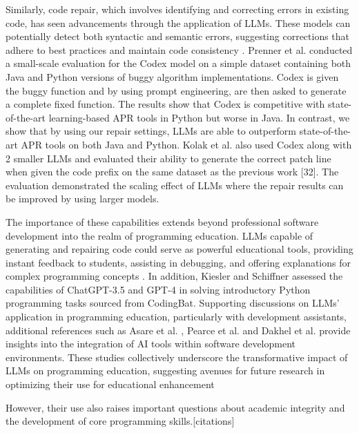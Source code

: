 Similarly, code repair, which involves identifying and correcting errors in existing code, has seen advancements through the application of LLMs. These models can potentially detect both syntactic and semantic errors, suggesting corrections that adhere to best practices and maintain code consistency \cite{DBLP:conf/icse/JiangL021, parasaram2024factselectionproblemllmbased, olausson2024selfrepairsilverbulletcode}. Prenner et al. \cite{10.1145/3524459.3527351} conducted a small-scale evaluation for the Codex model on a simple dataset containing both Java and Python versions of buggy algorithm implementations. Codex is given the buggy function and by using prompt engineering, are then asked to generate a complete fixed function. The results show that Codex is competitive with state-of-the-art learning-based APR tools in Python but worse in Java. In contrast, we show that by using our repair settings, LLMs are able to outperform state-of-the-art APR tools on both Java and Python. Kolak et al. \cite{osti_10340618} also used Codex along with 2 smaller LLMs and evaluated their ability to generate the correct patch line when given the code prefix on the same dataset as the previous work [32]. The evaluation demonstrated the scaling effect of LLMs where the repair results can be improved by using larger models.

The importance of these capabilities extends beyond professional software development into the realm of programming education. LLMs capable of generating and repairing code could serve as powerful educational tools, providing instant feedback to students, assisting in debugging, and offering explanations for complex programming concepts \cite{10.1145/3597503.3639219, 10.1145/3544548.3580919, 10.1145/3631802.3631806, 10.1145/3613904.3642706, jury2024evaluating}. In addition, Kiesler and Schiffner \cite{kiesler2023largelanguagemodelsintroductory} assessed the capabilities of ChatGPT-3.5 and GPT-4 in solving introductory Python programming tasks sourced from CodingBat. Supporting discussions on LLMs’ application in programming education, particularly with development assistants, additional references such as Asare et al. \cite{10.1007/s10664-023-10380-1}, Pearce et al. \cite{DBLP:conf/sp/PearceA0DK22} and Dakhel et al. \cite{DBLP:journals/jss/DakhelMNKDJ23} provide insights into the integration of AI tools within software development environments. These studies collectively underscore the transformative impact of LLMs on programming education, suggesting avenues for future research in optimizing their use for educational enhancement


However, their use also raises important questions about academic integrity and the development of core programming skills.[citations]
